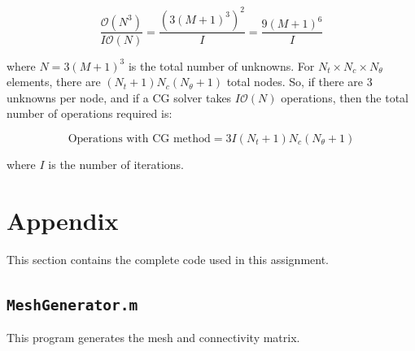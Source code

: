 \documentclass[10pt]{article}
\begin{document}
\begin{equation}
\frac{\mathscr{O}(N^3)}{I\mathscr{O}(N)}=\frac{\left(3(M+1)^3\right)^2}{I}=\frac{9(M+1)^6}{I}
\end{equation}

where \(N=3(M+1)^3\) is the total number of unknowns. For \(N_t\times N_c\times N_\theta\) elements, there are \((N_t+1)N_c(N_\theta+1)\) total nodes. So, if there are 3 unknowns per node, and if a CG solver takes \(I\mathscr{O}(N)\) operations, then the total number of operations required is:

\begin{equation}
\text{Operations with CG method}=3I(N_t+1)N_c(N_\theta+1)
\end{equation}
 
 where \(I\) is the number of iterations.

\section{Appendix}

This section contains the complete code used in this assignment. 

\subsection{\texttt{MeshGenerator.m}}
This program generates the mesh and connectivity matrix.

\end{document}
